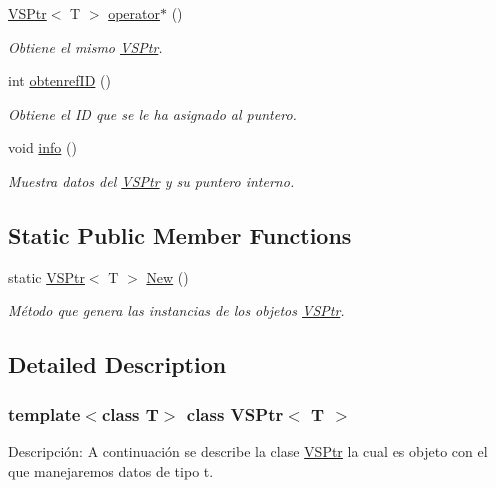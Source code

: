 \begin{DoxyCompactItemize}
\hyperlink{class_v_s_ptr}{V\+S\+Ptr}$<$ T $>$ \hyperlink{class_v_s_ptr_a99bd5070f565cc570d55b441c6d78bda}{operator$\ast$} ()
\begin{DoxyCompactList}\small\item\em Obtiene el mismo \hyperlink{class_v_s_ptr}{V\+S\+Ptr}. \end{DoxyCompactList}\item 
int \hyperlink{class_v_s_ptr_a915f6d6fd3c35bd6409b21f62284087e}{obtenref\+ID} ()
\begin{DoxyCompactList}\small\item\em Obtiene el ID que se le ha asignado al puntero. \end{DoxyCompactList}\item 
void \hyperlink{class_v_s_ptr_a8bce3297cb819c3f35e24d7ef921539f}{info} ()
\begin{DoxyCompactList}\small\item\em Muestra datos del \hyperlink{class_v_s_ptr}{V\+S\+Ptr} y su puntero interno. \end{DoxyCompactList}\end{DoxyCompactItemize}
\subsection*{Static Public Member Functions}
\begin{DoxyCompactItemize}
\item 
static \hyperlink{class_v_s_ptr}{V\+S\+Ptr}$<$ T $>$ \hyperlink{class_v_s_ptr_a4dbf1c0d3ac694fef78baa8d15ec7eb1}{New} ()
\begin{DoxyCompactList}\small\item\em Método que genera las instancias de los objetos \hyperlink{class_v_s_ptr}{V\+S\+Ptr}. \end{DoxyCompactList}\end{DoxyCompactItemize}


\subsection{Detailed Description}
\subsubsection*{template$<$class T$>$\newline
class V\+S\+Ptr$<$ T $>$}

Descripción\+: A continuación se describe la clase \hyperlink{class_v_s_ptr}{V\+S\+Ptr} la cual es objeto con el que manejaremos datos de tipo t. 

